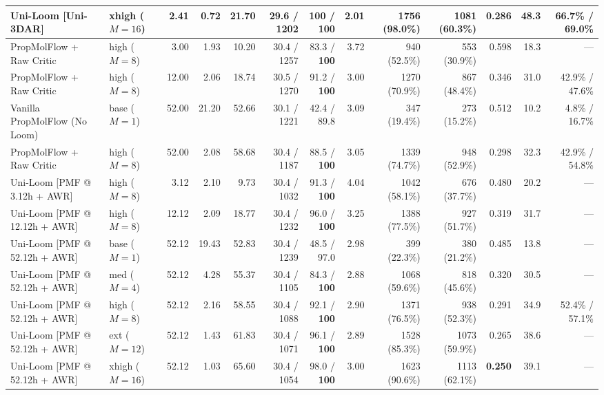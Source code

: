 \documentclass[11pt,a4paper]{article}
\begin{document}
\begin{table}[!h]
{\begin{tabular}{@{}llrrrrrrrrrrr@{}}
    Uni-Loom [Uni-3DAR] & xhigh ($M=16$) & \textbf{2.41} & 0.72 & 21.70 & 29.6 / 1202 & \textbf{100} / \textbf{100} & 2.01 & \textbf{1756} (\textbf{98.0\%}) & 1081 (60.3\%) & 0.286 & 48.3 & \textbf{66.7\%} / \textbf{69.0\%} \\
    \midrule
    PropMolFlow + Raw Critic & high ($M=8$) & 3.00 & 1.93 & 10.20 & 30.4 / 1257 & 83.3 / \textbf{100} & 3.72 & 940 (52.5\%) & 553 (30.9\%) & 0.598 & 18.3 & --- \\
    PropMolFlow + Raw Critic & high ($M=8$) & 12.00 & 2.06 & 18.74 & 30.5 / 1270 & 91.2 / \textbf{100} & 3.00 & 1270 (70.9\%) & 867 (48.4\%) & 0.346 & 31.0 & 42.9\% / 47.6\% \\
    Vanilla PropMolFlow (No Loom) & base ($M=1$) & 52.00 & 21.20 & 52.66 & 30.1 / 1221 & 42.4 / 89.8 & 3.09 & 347 (19.4\%) & 273 (15.2\%) & 0.512 & 10.2 & 4.8\% / 16.7\% \\
    PropMolFlow + Raw Critic & high ($M=8$) & 52.00 & 2.08 & 58.68 & 30.4 / 1187 & 88.5 / \textbf{100} & 3.05 & 1339 (74.7\%) & 948 (52.9\%) & 0.298 & 32.3 & 42.9\% / 54.8\% \\
    \midrule
    Uni-Loom [PMF @ 3.12h + AWR] & high ($M=8$) & 3.12 & 2.10 & 9.73 & 30.4 / 1032 & 91.3 / \textbf{100} & 4.04 & 1042 (58.1\%) & 676 (37.7\%) & 0.480 & 20.2 & --- \\
    Uni-Loom [PMF @ 12.12h + AWR] & high ($M=8$) & 12.12 & 2.09 & 18.77 & 30.4 / 1232 & 96.0 / \textbf{100} & 3.25 & 1388 (77.5\%) & 927 (51.7\%) & 0.319 & 31.7 & --- \\
    Uni-Loom [PMF @ 52.12h + AWR] & base ($M=1$) & 52.12 & 19.43 & 52.83 & 30.4 / 1239 & 48.5 / 97.0 & 2.98 & 399 (22.3\%) & 380 (21.2\%) & 0.485 & 13.8 & --- \\
    Uni-Loom [PMF @ 52.12h + AWR] & med ($M=4$) & 52.12 & 4.28 & 55.37 & 30.4 / 1105 & 84.3 / \textbf{100} & 2.88 & 1068 (59.6\%) & 818 (45.6\%) & 0.320 & 30.5 & --- \\
    Uni-Loom [PMF @ 52.12h + AWR] & high ($M=8$) & 52.12 & 2.16 & 58.55 & 30.4 / 1088 & 92.1 / \textbf{100} & 2.90 & 1371 (76.5\%) & 938 (52.3\%) & 0.291 & 34.9 & 52.4\% / 57.1\% \\
    Uni-Loom [PMF @ 52.12h + AWR] & ext ($M=12$) & 52.12 & 1.43 & 61.83 & 30.4 / 1071 & 96.1 / \textbf{100} & 2.89 & 1528 (85.3\%) & 1073 (59.9\%) & 0.265 & 38.6 & --- \\
    Uni-Loom [PMF @ 52.12h + AWR] & xhigh ($M=16$) & 52.12 & 1.03 & 65.60 & 30.4 / 1054 & 98.0 / \textbf{100} & 3.00 & 1623 (90.6\%) & 1113 (62.1\%) & \textbf{0.250} & 39.1 & --- \\

\end{tabular}}
\end{table}
\end{document}
